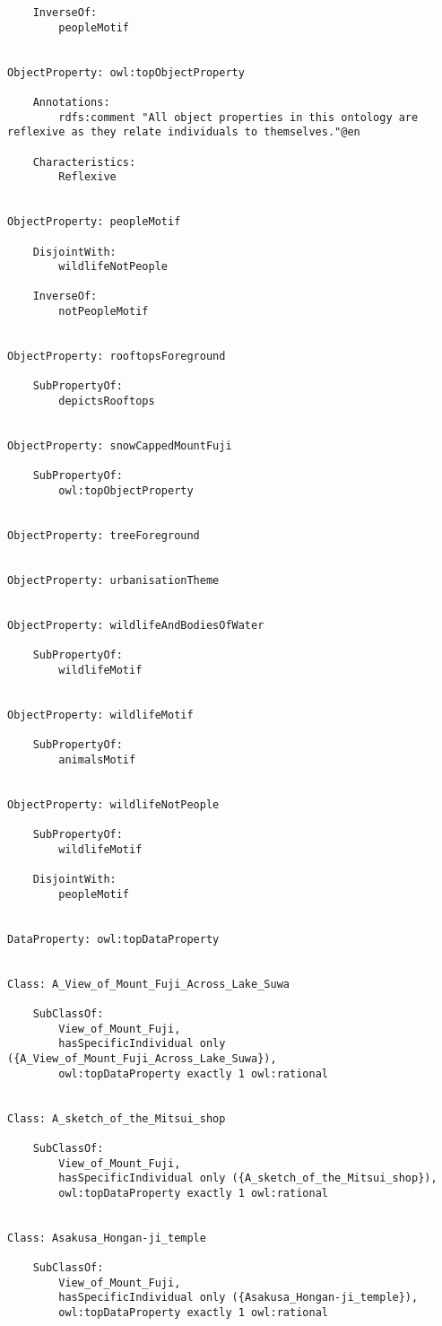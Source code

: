 \documentclass[titlepage,a4paper,12pt,oneside]{book}
\begin{document}
\begin{appendices}
\begin{lstlisting}
    InverseOf: 
        peopleMotif
    
    
ObjectProperty: owl:topObjectProperty

    Annotations: 
        rdfs:comment "All object properties in this ontology are reflexive as they relate individuals to themselves."@en
    
    Characteristics: 
        Reflexive

    
ObjectProperty: peopleMotif

    DisjointWith: 
        wildlifeNotPeople
    
    InverseOf: 
        notPeopleMotif
    
    
ObjectProperty: rooftopsForeground

    SubPropertyOf: 
        depictsRooftops
    
    
ObjectProperty: snowCappedMountFuji

    SubPropertyOf: 
        owl:topObjectProperty
    
    
ObjectProperty: treeForeground

    
ObjectProperty: urbanisationTheme

    
ObjectProperty: wildlifeAndBodiesOfWater

    SubPropertyOf: 
        wildlifeMotif
    
    
ObjectProperty: wildlifeMotif

    SubPropertyOf: 
        animalsMotif
    
    
ObjectProperty: wildlifeNotPeople

    SubPropertyOf: 
        wildlifeMotif
    
    DisjointWith: 
        peopleMotif
    
    
DataProperty: owl:topDataProperty

    
Class: A_View_of_Mount_Fuji_Across_Lake_Suwa

    SubClassOf: 
        View_of_Mount_Fuji,
        hasSpecificIndividual only ({A_View_of_Mount_Fuji_Across_Lake_Suwa}),
        owl:topDataProperty exactly 1 owl:rational
    
    
Class: A_sketch_of_the_Mitsui_shop

    SubClassOf: 
        View_of_Mount_Fuji,
        hasSpecificIndividual only ({A_sketch_of_the_Mitsui_shop}),
        owl:topDataProperty exactly 1 owl:rational
    
    
Class: Asakusa_Hongan-ji_temple

    SubClassOf: 
        View_of_Mount_Fuji,
        hasSpecificIndividual only ({Asakusa_Hongan-ji_temple}),
        owl:topDataProperty exactly 1 owl:rational
    

\end{lstlisting}
\end{appendices}
\end{document}
